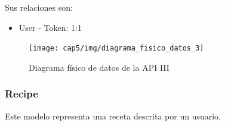 Sus relaciones son:
\begin{itemize}
\item User - Token: 1:1 
\end{itemize}

\begin{figure}[htbp]
  \centering
  \texttt{[image: cap5/img/diagrama\_fisico\_datos\_3]}
  \caption{Diagrama físico de datos de la API III}
  \label{fig:diagrama-fisico-datos-3}
\end{figure}


\subsubsection{Recipe}

Este modelo representa una receta descrita por un usuario.

